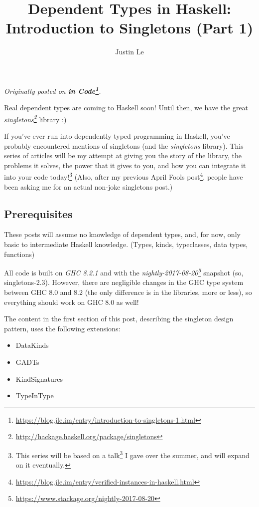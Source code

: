 \documentclass[]{article}
\title{Dependent Types in Haskell: Introduction to Singletons (Part 1)}
\author{Justin Le}
\renewcommand{\href}[2]{#2\footnote{\url{#1}}}
\begin{document}
\maketitle

\emph{Originally posted on
\textbf{\href{https://blog.jle.im/entry/introduction-to-singletons-1.html}{in
Code}}.}

Real dependent types are coming to Haskell soon! Until then, we have the great
\emph{\href{http://hackage.haskell.org/package/singletons}{singletons}} library
:)

If you've ever run into dependently typed programming in Haskell, you've
probably encountered mentions of singletons (and the \emph{singletons} library).
This series of articles will be my attempt at giving you the story of the
library, the problems it solves, the power that it gives to you, and how you can
integrate it into your code today!\footnote{This series will be based on
  \href{http://talks.jle.im/lambdaconf-2017/singletons/}{a talk} I gave over the
  summer, and will expand on it eventually.} (Also, after
\href{https://blog.jle.im/entry/verified-instances-in-haskell.html}{my previous
April Fools post}, people have been asking me for an actual non-joke singletons
post.)

\subsection{Prerequisites}\label{prerequisites}

These posts will assume no knowledge of dependent types, and, for now, only
basic to intermediate Haskell knowledge. (Types, kinds, typeclasses, data types,
functions)

All code is built on \emph{GHC 8.2.1} and with the
\emph{\href{https://www.stackage.org/nightly-2017-08-20}{nightly-2017-08-20}}
snapshot (so, singletons-2.3). However, there are negligible changes in the GHC
type system between GHC 8.0 and 8.2 (the only difference is in the libraries,
more or less), so everything should work on GHC 8.0 as well!

The content in the first section of this post, describing the singleton design
pattern, uses the following extensions:

\begin{itemize}
\tightlist
\item
  DataKinds
\item
  GADTs
\item
  KindSignatures
\item
  TypeInType
\end{itemize}
\end{document}
